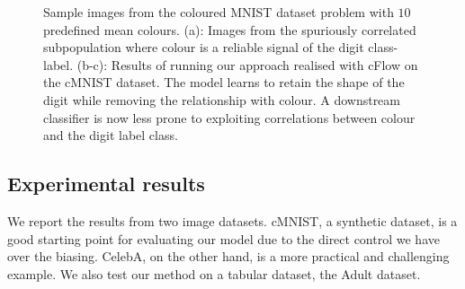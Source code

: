 \begin{figure}[!htb]
{        \label{fig:cflow_cmnist_y}
    }
    \hfill
    \caption{
        Sample images from the coloured MNIST dataset problem with $10$ predefined mean colours.
        (a): Images from the spuriously correlated subpopulation where colour is a reliable signal
        of the digit class-label.
        (b-c): Results of running our approach realised with \ac{cFlow} on the cMNIST dataset.
        The model learns to retain the shape of the digit while removing the relationship with
        colour.
        A downstream classifier is now less prone to exploiting correlations between colour and the
        digit label class.
    }\label{fig:cmnist}
\end{figure}
%
\subsection{Experimental results}
%
We report the results from two image datasets. cMNIST, a synthetic dataset, is a good starting
point for evaluating our model due to the direct control we have over the biasing. 
%
CelebA, on the other hand, is a more practical and challenging example.
%
We also test our method on a tabular dataset, the Adult dataset.
%
